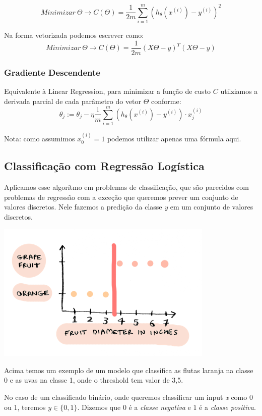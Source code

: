 \documentclass[11pt,a4paper,leqno]{article}
\begin{document}
\[
Minimizar \ \Theta \rightarrow C (\Theta) = \frac{1}{2m} \sum_{i=1}^m ( h_\theta (x^{(i)}) - y^{(i)}) ^ 2
\]

Na forma vetorizada podemos escrever como:
\[
Minimizar \ \Theta \rightarrow C (\Theta) = \frac{1}{2m} (X \Theta - y)^T (X \Theta - y)
\]

\subsubsection{Gradiente Descendente}
Equivalente à Linear Regression, para minimizar a função de custo $C$ utilziamos a derivada parcial de cada parâmetro do vetor $\Theta$ conforme:
\[
\theta_j := \theta_j - \eta \frac{1}{m} \sum\limits_{i=1}^{m} (h_\theta(x^{(i)}) - y^{(i)}) \cdot x_j^{(i)}
\]

Nota: como assumimos $x_0^{(i)} = 1$ podemos utilizar apenas uma fórmula aqui.



\subsection{Classificação com Regressão Logística}
Aplicamos esse algorítmo em problemas de classificação, que são parecidos com problemas de regressão com a exceção que queremos prever um conjunto de valores discretos.
Nele fazemos a predição da classe \emph{y} em um conjunto de valores discretos.

\includegraphics[scale=0.5]{Images/logistic_regression_plot_fit.png} 

Acima temos um exemplo de um modelo que classifica as flutas laranja na classe 0 e as uvas na classe 1, onde o threshold tem valor de 3,5.

No caso de um classificado binário, onde queremos classificar um input \emph{x} como 0 ou 1, teremos $y \in \{0, 1\}$.
Dizemos que $0$ é a \emph{classe negativa} e $1$ é a \emph{classe positiva}.
\end{document}

